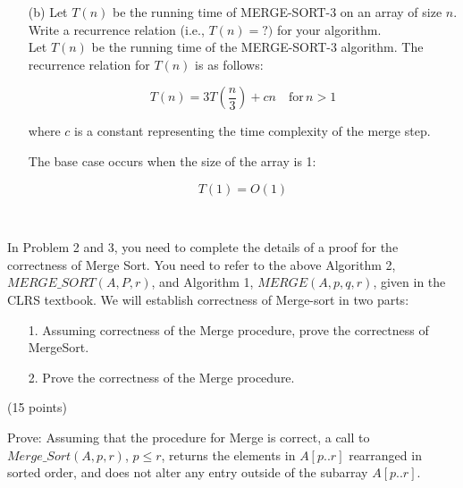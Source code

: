\documentclass[12pt]{article}
\newcommand{\vs}{\vspace{2mm}}
\begin{document}
\begin{itemize}
\item[(b)] Let $T(n)$ be the running time of MERGE-SORT-3 on an array of size $n$. Write a recurrence relation (i.e., $T(n) = ? )$ for your algorithm. \\

Let \( T(n) \) be the running time of the MERGE-SORT-3 algorithm. The recurrence relation for \( T(n) \) is as follows:

\[ T(n) = 3T\left(\frac{n}{3}\right) + cn \quad \text{for} \, n > 1 \]

where \( c \) is a constant representing the time complexity of the merge step.

The base case occurs when the size of the array is 1:

\[ T(1) = O(1) \]

\end{itemize}
\vs\

In Problem 2 and 3, you need to complete the details  of a proof for the correctness of Merge Sort. You need to refer to the above Algorithm 2, $MERGE\_SORT(A,P,r)$,  and Algorithm 1, $MERGE(A,p,q,r)$, given in the CLRS textbook. We will establish correctness of Merge-sort in two parts:

\begin{itemize}
    
\item[1.] Assuming correctness of the Merge procedure, prove the correctness of MergeSort.
\item[2.] Prove the correctness of the  Merge procedure.

\end{itemize}
(15 points)

Prove: Assuming that the procedure for Merge is correct, a call to $Merge\_Sort(A, p, r)$,
$p \leq r$, returns the elements in $A[p..r]$ rearranged in sorted order, and does not alter any entry
outside of the subarray $A[p..r].$
\end{document}
